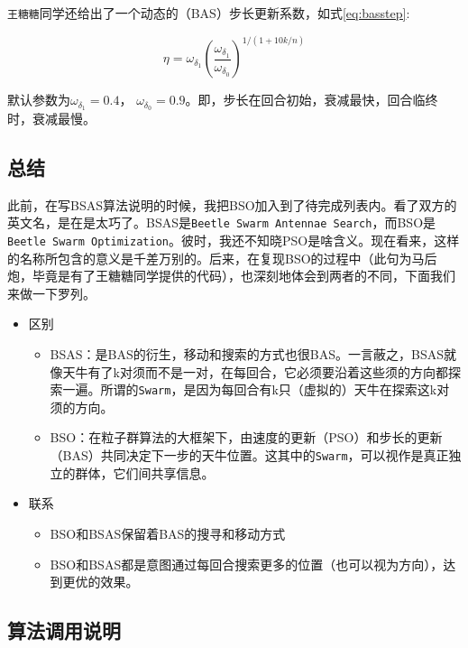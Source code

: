 \documentclass[]{ctexbook}
\providecommand{\tightlist}{%
  \setlength{\itemsep}{0pt}\setlength{\parskip}{0pt}}
\theoremstyle{definition}
\theoremstyle{definition}
\theoremstyle{definition}
\theoremstyle{remark}
\begin{document}
\texttt{王糖糖}同学还给出了一个动态的（BAS）步长更新系数，如式\eqref{eq:basstep}:

\begin{equation}
\eta = \omega_{\delta_1}(\frac{\omega_{\delta_1}}{\omega_{\delta_0}})^{1/(1+10k/n)}
\label{eq:basstep}
\end{equation}

默认参数为\(\omega_{\delta_1} = 0.4\)，
\(\omega_{\delta_0} = 0.9\)。即，步长在回合初始，衰减最快，回合临终时，衰减最慢。

\subsection{总结}

此前，在写BSAS算法说明的时候，我把BSO加入到了待完成列表内。看了双方的英文名，是在是太巧了。BSAS是\texttt{Beetle\ Swarm\ Antennae\ Search}，而BSO是\texttt{Beetle\ Swarm\ Optimization}。彼时，我还不知晓PSO是啥含义。现在看来，这样的名称所包含的意义是千差万别的。后来，在复现BSO的过程中（此句为马后炮，毕竟是有了王糖糖同学提供的代码），也深刻地体会到两者的不同，下面我们来做一下罗列。

\begin{itemize}
\tightlist
\item
  区别

  \begin{itemize}
  \tightlist
  \item
    BSAS：是BAS的衍生，移动和搜索的方式也很BAS。一言蔽之，BSAS就像天牛有了k对须而不是一对，在每回合，它必须要沿着这些须的方向都探索一遍。所谓的\texttt{Swarm}，是因为每回合有k只（虚拟的）天牛在探索这k对须的方向。
  \item
    BSO：在粒子群算法的大框架下，由速度的更新（PSO）和步长的更新（BAS）共同决定下一步的天牛位置。这其中的\texttt{Swarm}，可以视作是真正独立的群体，它们间共享信息。
  \end{itemize}
\item
  联系

  \begin{itemize}
  \tightlist
  \item
    BSO和BSAS保留着BAS的搜寻和移动方式
  \item
    BSO和BSAS都是意图通过每回合搜索更多的位置（也可以视为方向），达到更优的效果。
  \end{itemize}
\end{itemize}

\subsection{算法调用说明}\label{BSOparms}
\end{document}
